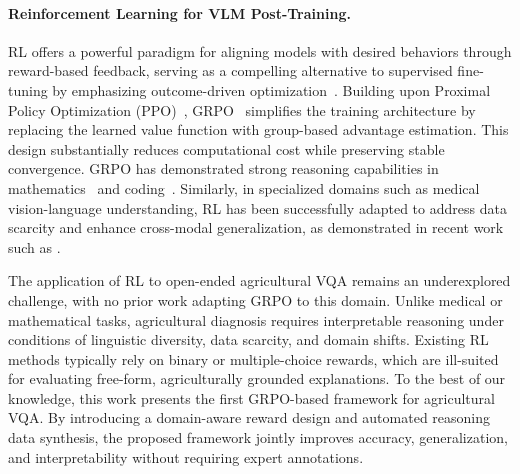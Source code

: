 \documentclass[sigconf,anonymous,review]{acmart}
\begin{document}
\paragraph{Reinforcement Learning for VLM Post-Training.}

RL offers a powerful paradigm for aligning models with desired behaviors through reward-based feedback, serving as a compelling alternative to supervised fine-tuning by emphasizing outcome-driven optimization~\cite{christiano2017deep,ladosz2022exploration}. Building upon Proximal Policy Optimization (PPO)~\cite{schulman2017proximal}, GRPO~\cite{shao2024deepseekmath} simplifies the training architecture by replacing the learned value function with group-based advantage estimation. This design substantially reduces computational cost while preserving stable convergence. GRPO has demonstrated strong reasoning capabilities in mathematics~\cite{shao2024deepseekmath} and coding~\cite{guo2025deepseek}. Similarly, in specialized domains such as medical vision-language understanding, RL has been successfully adapted to address data scarcity and enhance cross-modal generalization, as demonstrated in recent work such as \citet{zhi2025medgr}.

The application of RL to open-ended agricultural VQA remains an underexplored challenge, with no prior work adapting GRPO to this domain. Unlike medical or mathematical tasks, agricultural diagnosis requires interpretable reasoning under conditions of linguistic diversity, data scarcity, and domain shifts. Existing RL methods typically rely on binary or multiple-choice rewards, which are ill-suited for evaluating free-form, agriculturally grounded explanations. To the best of our knowledge, this work presents the first GRPO-based framework for agricultural VQA. By introducing a domain-aware reward design and automated reasoning data synthesis, the proposed framework jointly improves accuracy, generalization, and interpretability without requiring expert annotations.
\end{document}
